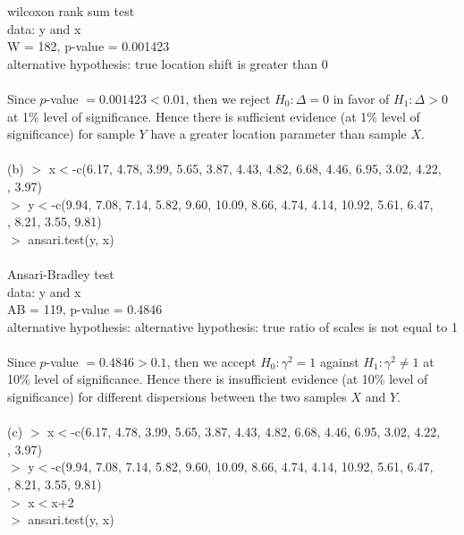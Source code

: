 \documentclass[12pt,a4paper]{article}
\begin{document}
\newpage
\indent\indent\indent\indent\indent\indent wilcoxon rank sum test\\
\indent data: y and x\\
\indent W = 182, p-value = 0.001423\\
\indent alternative hypothesis: true location shift is greater than 0\\
~\\
Since $p$-value $=0.001423<0.01$, then we reject $H_{0}:\Delta =0$ in favor of $H_{1}:\Delta >0$ at 1\% level of significance. Hence there is sufficient evidence (at 1\% level of significance) for sample $Y$ have a greater location parameter than sample $X$.\\
~\\
(b) $>$ x$<$-c(6.17, 4.78, 3.99, 5.65, 3.87, 4.43, 4.82, 6.68, 4.46, 6.95, 3.02, 4.22, \\ \indent\indent{}, 3.97)\\
\indent $>$ y$<$-c(9.94, 7.08, 7.14, 5.82, 9.60, 10.09, 8.66, 4.74, 4.14, 10.92, 5.61, 6.47, \\ \indent\indent{}, 8.21, 3.55, 9.81)\\
\indent $>$ ansari.test(y, x)\\
~\\
\indent\indent\indent\indent\indent\indent Ansari-Bradley test\\
\indent data: y and x\\
\indent AB = 119, p-value = 0.4846\\
\indent alternative hypothesis: alternative hypothesis: true ratio of scales is not \indent equal to 1\\
~\\
Since $p$-value $=0.4846>0.1$, then we accept $H_{0}:\gamma^{2} =1$ against $H_{1}:\gamma^{2}\neq 1$ at 10\% level of significance. Hence there is insufficient evidence (at 10\% level of significance) for different dispersions between the two samples $X$ and $Y$.\\
~\\
(c) $>$ x$<$-c(6.17, 4.78, 3.99, 5.65, 3.87, 4.43, 4.82, 6.68, 4.46, 6.95, 3.02, 4.22, \\ \indent\indent{}, 3.97)\\
\indent $>$ y$<$-c(9.94, 7.08, 7.14, 5.82, 9.60, 10.09, 8.66, 4.74, 4.14, 10.92, 5.61, 6.47, \\ \indent\indent{}, 8.21, 3.55, 9.81)\\
\indent $>$ x$<$x+2\\
\indent $>$ ansari.test(y, x)\\
\end{document}
